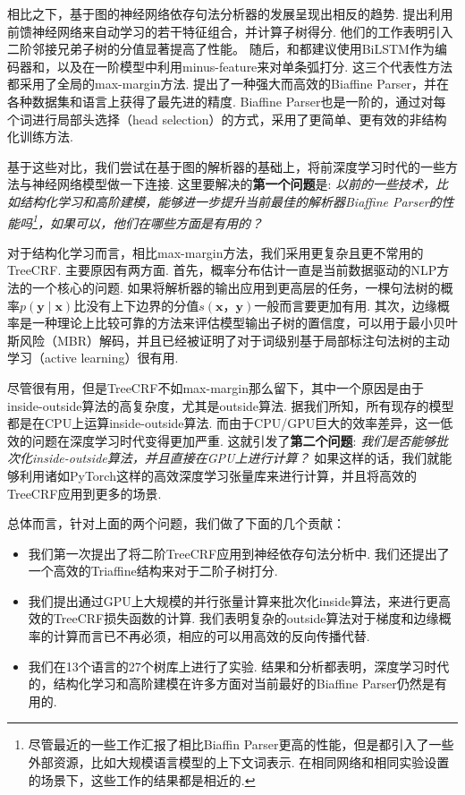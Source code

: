 相比之下，基于图的神经网络依存句法分析器的发展呈现出相反的趋势.
\cite{pei-etal-2015-effective}提出利用前馈神经网络来自动学习\cite{chen-manning-2014-fast}的若干特征组合，并计算子树得分.
他们的工作表明引入二阶邻接兄弟子树的分值显著提高了性能。
随后，\cite{wang-chang-2016-graph}和\cite{kiperwasser-goldberg-2016-simple}都建议使用BiLSTM作为编码器和，以及在一阶模型中利用minus-feature来对单条弧打分.
这三个代表性方法都采用了全局的max-margin方法.
\cite{Timothy-d17-biaffine}提出了一种强大而高效的Biaffine Parser，并在各种数据集和语言上获得了最先进的精度.
Biaffine Parser也是一阶的，通过对每个词进行局部头选择（head selection）的方式\cite{zhang-etal-2017-dependency-parsing}，采用了更简单、更有效的非结构化训练方法.

基于这些对比，我们尝试在基于图的解析器的基础上，将前深度学习时代的一些方法与神经网络模型做一下连接.
这里要解决的\textbf{第一个问题}是:
\emph{以前的一些技术，比如结构化学习和高阶建模，能够进一步提升当前最佳的解析器Biaffine Parser的性能吗\footnote{
        尽管最近的一些工作汇报了相比Biaffin Parser更高的性能，但是都引入了一些外部资源，比如大规模语言模型的上下文词表示. 在相同网络和相同实验设置的场景下，这些工作的结果都是相近的.
    }，如果可以，他们在哪些方面是有用的？}

对于结构化学习而言，相比max-margin方法，我们采用更复杂且更不常用的TreeCRF.
主要原因有两方面.
首先，概率分布估计一直是当前数据驱动的NLP方法的一个核心的问题\cite{le-zuidema-2014-inside}.
如果将解析器的输出应用到更高层的任务，一棵句法树的概率$p(\boldsymbol{y}\mid\boldsymbol{x})$比没有上下边界的分值$s (\boldsymbol{x}，\boldsymbol{y})$一般而言要更加有用.
其次，边缘概率是一种理论上比较可靠的方法来评估模型输出子树的置信度，可以用于最小贝叶斯风险（MBR）解码\cite{smith-smith-2007-probabilistic}，并且已经被证明了对于词级别基于局部标注句法树的主动学习（active learning）\cite{li-etal-2016-active}很有用.

尽管很有用，但是TreeCRF不如max-margin那么留下，其中一个原因是由于inside-outside算法的高复杂度，尤其是outside算法.
据我们所知，所有现存的模型都是在CPU上运算inside-outside算法.
而由于CPU/GPU巨大的效率差异，这一低效的问题在深度学习时代变得更加严重.
这就引发了\textbf{第二个问题}:
\emph{我们是否能够批次化inside-outside算法，并且直接在GPU上进行计算？}
如果这样的话，我们就能够利用诸如PyTorch这样的高效深度学习张量库来进行计算，并且将高效的TreeCRF应用到更多的场景\cite{cai-etal-2017-crf,le-zuidema-2014-inside}.

总体而言，针对上面的两个问题，我们做了下面的几个贡献：
\begin{itemize}%
    \item 我们第一次提出了将二阶TreeCRF应用到神经依存句法分析中.
          我们还提出了一个高效的Triaffine结构来对于二阶子树打分.
    \item 我们提出通过GPU上大规模的并行张量计算来批次化inside算法，来进行更高效的TreeCRF损失函数的计算.
          我们表明复杂的outside算法对于梯度和边缘概率的计算而言已不再必须，相应的可以用高效的反向传播代替.
    \item 我们在13个语言的27个树库上进行了实验.
          结果和分析都表明，深度学习时代的，结构化学习和高阶建模在许多方面对当前最好的Biaffine Parser仍然是有用的.
\end{itemize}

